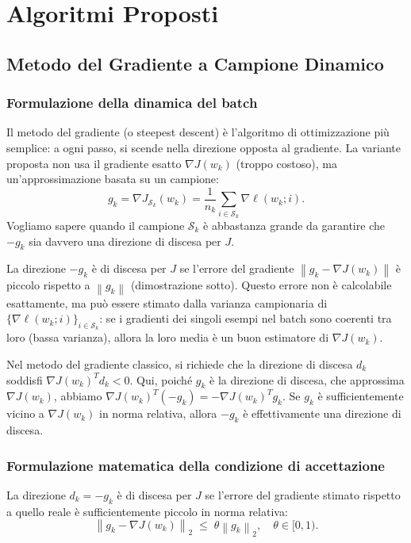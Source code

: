\documentclass[a4paper,12pt]{article}
\newcommand{\norm}[1]{\left\|#1\right\|}
\begin{document}
\section{Algoritmi Proposti}

\subsection{Metodo del Gradiente a Campione Dinamico}

\subsubsection{Formulazione della dinamica del batch}

Il metodo del gradiente (o steepest descent) \`e l'algoritmo di ottimizzazione pi\`u semplice: a ogni passo, si scende nella direzione opposta al gradiente. La variante proposta non usa il gradiente esatto $\nabla J(w_k)$ (troppo costoso), ma un'approssimazione basata su un campione:
\[
  g_k = \nabla J_{\mathcal{S}_k}(w_k) = \frac{1}{n_k}\sum_{i \in \mathcal{S}_k} \nabla \ell(w_k;i).
\]
Vogliamo sapere quando il campione $\mathcal{S}_k$ \`e abbastanza grande da garantire che $-g_k$ sia davvero una direzione di discesa per $J$.

La direzione $-g_k$ è di discesa per $J$ se l'errore del gradiente $\norm{g_k - \nabla J(w_k)}$ \`e piccolo rispetto a $\norm{g_k}$ (dimostrazione sotto). Questo errore non \`e calcolabile esattamente, ma pu\`o essere stimato dalla varianza campionaria di $\{{\nabla \ell(w_k;i)}\}_{i \in \mathcal{S}_k}$: se i gradienti dei singoli esempi nel batch sono coerenti tra loro (bassa varianza), allora la loro media \`e un buon estimatore di $\nabla J(w_k)$.

  Nel metodo del gradiente classico, si richiede che la direzione di discesa $d_k$ soddisfi $\nabla J(w_k)^T d_k < 0$. Qui, poiché $g_k$ è la direzione di discesa, che approssima $\nabla J(w_k)$, abbiamo $\nabla J(w_k)^T (-g_k) = - \nabla J(w_k)^T g_k$. Se $g_k$ è sufficientemente vicino a $\nabla J(w_k)$ in norma relativa, allora $-g_k$ è effettivamente una direzione di discesa.

\subsubsection{Formulazione matematica della condizione di accettazione}

La direzione $d_k = -g_k$ \`e di discesa per $J$ se l'errore del gradiente stimato rispetto a quello reale \`e sufficientemente piccolo in norma relativa:
\[
  \norm{g_k - \nabla J(w_k)}_2 \;\leq\; \theta \norm{g_k}_2, \quad \theta \in [0,1).
\]
\end{document}
